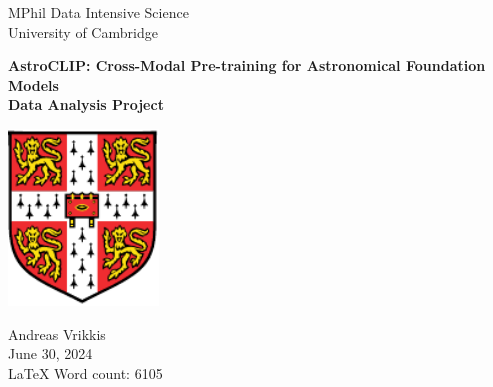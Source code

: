 \documentclass[a4paper,12pt]{article}
\begin{document}
    
    \vspace*{3cm}
    
    \begin{center}
     {\Large MPhil Data Intensive Science}  \\ [3pt]
     {\Large University of Cambridge}  \\ [3pt]
     
     \vspace*{1cm}
     \hrulefill
     \vspace*{0.75cm}
     
     {\LARGE \textbf{AstroCLIP: Cross-Modal Pre-training for Astronomical Foundation Models}} \\ [6pt]
     \large \textbf{Data Analysis Project} \\ [6pt]
     \vspace*{0.05cm}
     \hrulefill
     \vspace*{1.5cm}

    \includegraphics[width=0.3\textwidth]{../figures/University_Crest.pdf} 

    \vspace*{1.5cm}
     
     {\Large  Andreas Vrikkis} \\ [6pt]
     {\large  June 30, 2024} \\ [3pt]
     {\large  \LaTeX \hspace{0.03cm} Word count: 6105 } \\ [3pt]
     
     \end{center}   
    
    
    \newpage
    
    \restoregeometry
    
\end{document}
